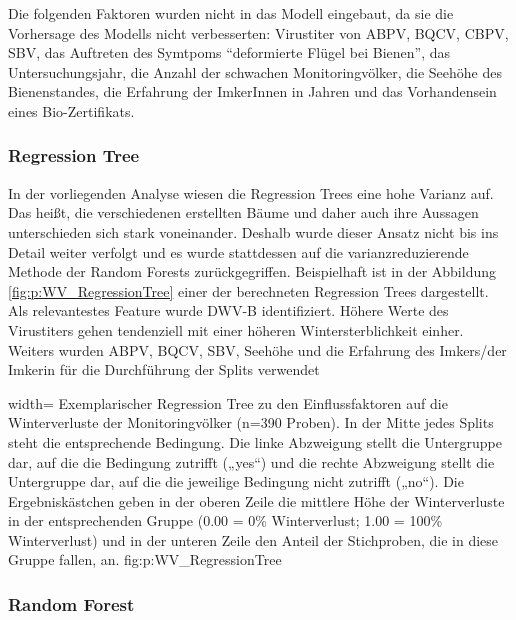 

Die folgenden Faktoren wurden nicht in das Modell eingebaut, da sie die Vorhersage des Modells nicht verbesserten: Virustiter von ABPV, BQCV, CBPV, SBV, das Auftreten des Symtpoms \enquote{deformierte Flügel bei Bienen}, das Untersuchungsjahr, die Anzahl der schwachen Monitoringvölker, die Seehöhe des Bienenstandes, die Erfahrung der ImkerInnen in Jahren und das Vorhandensein eines Bio-Zertifikats.

\subsubsection{Regression Tree}

In der vorliegenden Analyse wiesen die Regression Trees eine hohe Varianz auf. Das heißt, die verschiedenen erstellten Bäume und daher auch ihre Aussagen unterschieden sich stark voneinander. Deshalb wurde dieser Ansatz nicht bis ins Detail weiter verfolgt und es wurde stattdessen auf die varianzreduzierende Methode der Random Forests zurückgegriffen. Beispielhaft ist in der Abbildung \ref{fig:p:WV_RegressionTree} einer der berechneten Regression Trees dargestellt. Als relevantestes Feature wurde DWV-B identifiziert. Höhere Werte des Virustiters gehen tendenziell mit einer höheren Wintersterblichkeit einher. Weiters wurden ABPV, BQCV, SBV, Seehöhe und die Erfahrung des Imkers/der Imkerin für die Durchführung der Splits verwendet


  {width=\textwidth} %
  {Exemplarischer Regression Tree zu den Einflussfaktoren auf die Winterverluste der Monitoringvölker (n=390 Proben). In der Mitte jedes Splits steht die entsprechende Bedingung. Die linke Abzweigung stellt die Untergruppe dar, auf die die Bedingung zutrifft („yes“) und die rechte Abzweigung stellt die Untergruppe dar, auf die die jeweilige Bedingung nicht zutrifft („no“). Die Ergebniskästchen geben in der oberen Zeile die mittlere Höhe der Winterverluste in der entsprechenden Gruppe (0.00 = 0\% Winterverlust; 1.00 = 100\% Winterverlust) und in der unteren Zeile den Anteil der Stichproben, die in diese Gruppe fallen, an.} %
  {} %
  {fig:p:WV_RegressionTree} %


\subsubsection{Random Forest}

